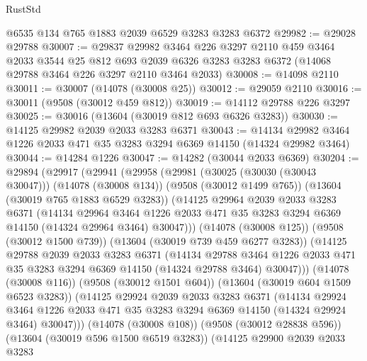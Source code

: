 \begin{lexlean}{RustStd}
\begin{coremodule}
    @6535
    @134
    @765
    @1883
    @2039
    @6529
    @3283
    @3283
    @6372
@29982 := @29028 @29788
@30007 := @29837
    @29982
    @3464
    @226
    @3297
    @2110
    @459
    @3464
    @2033
    @3544
    @25
    @812
    @693
    @2039
    @6326
    @3283
    @3283
    @6372
    (@14068 @29788 @3464 @226 @3297 @2110 @3464 @2033)
@30008 := @14098 @2110
@30011 := @30007 (@14078 (@30008 @25))
@30012 := @29059 @2110
@30016 := @30011 (@9508 (@30012 @459 @812))
@30019 := @14112 @29788 @226 @3297
@30025 := @30016 (@13604 (@30019 @812 @693 @6326 @3283))
@30030 := @14125 @29982 @2039 @2033 @3283 @6371
@30043 := @14134 @29982 @3464 @1226 @2033 @471 @35 @3283 @3294 @6369 @14150 (@14324 @29982 @3464)
@30044 := @14284 @1226
@30047 := @14282 (@30044 @2033 @6369)
@30204 := @29894
    (@29917
      (@29941
        (@29958
          (@29981
            (@30025 (@30030 (@30043 @30047)))
            (@14078 (@30008 @134))
            (@9508 (@30012 @1499 @765))
            (@13604 (@30019 @765 @1883 @6529 @3283))
            (@14125
              @29964
              @2039
              @2033
              @3283
              @6371
              (@14134
                @29964
                @3464
                @1226
                @2033
                @471
                @35
                @3283
                @3294
                @6369
                @14150
                (@14324 @29964 @3464)
                @30047)))
          (@14078 (@30008 @125))
          (@9508 (@30012 @1500 @739))
          (@13604 (@30019 @739 @459 @6277 @3283))
          (@14125
            @29788
            @2039
            @2033
            @3283
            @6371
            (@14134
              @29788
              @3464
              @1226
              @2033
              @471
              @35
              @3283
              @3294
              @6369
              @14150
              (@14324 @29788 @3464)
              @30047)))
        (@14078 (@30008 @116))
        (@9508 (@30012 @1501 @604))
        (@13604 (@30019 @604 @1509 @6523 @3283))
        (@14125
          @29924
          @2039
          @2033
          @3283
          @6371
          (@14134
            @29924
            @3464
            @1226
            @2033
            @471
            @35
            @3283
            @3294
            @6369
            @14150
            (@14324 @29924 @3464)
            @30047)))
      (@14078 (@30008 @108))
      (@9508 (@30012 @28838 @596))
      (@13604 (@30019 @596 @1500 @6519 @3283))
      (@14125
        @29900
        @2039
        @2033
        @3283

\end{coremodule}
\end{lexlean}
